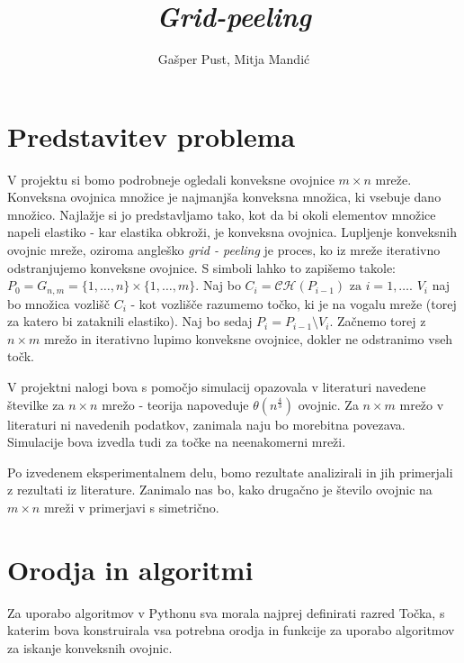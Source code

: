 \documentclass[a4paper]{article}
\title{\textit{Grid-peeling}}
\author{Gašper Pust, Mitja Mandić}
\begin{document}
\lstset{language=Python, breaklines=true, numbers=left, columns=fullflexible, basicstyle=\ttfamily}
\begin{titlepage}
 \maketitle
\end{titlepage}
%

\section{Predstavitev problema}
V projektu si bomo podrobneje ogledali konveksne ovojnice $m \times n$ mreže. Konveksna ovojnica množice je najmanjša konveksna množica, ki vsebuje dano množico.
Najlažje si jo predstavljamo tako, kot da bi okoli elementov množice napeli elastiko - kar elastika obkroži, je konveksna ovojnica. Lupljenje konveksnih ovojnic mreže,
oziroma angleško \textit{grid - peeling} je proces, ko iz mreže iterativno odstranjujemo konveksne ovojnice. S simboli lahko to zapišemo takole:
$ P_{0} = G_{n,m} = \{1,\ldots, n\} \times \{1, \ldots, m\}$. Naj bo $C_{i} = \mathcal{C}\mathcal{H}(P_{i-1}) \text{ za } i = 1, \ldots$. $V_{i}$ naj bo množica vozlišč $C_{i}$
- kot vozlišče razumemo točko, ki je na vogalu mreže (torej za katero bi zataknili elastiko). Naj bo sedaj $P_{i} = P_{i-1} \setminus V_{i}$. Začnemo torej z $n \times m$ mrežo 
in iterativno lupimo konveksne ovojnice, dokler ne odstranimo vseh točk.

V projektni nalogi bova s pomočjo simulacij opazovala v literaturi navedene številke za $n \times n$ mrežo - teorija napoveduje $\theta(n ^ \frac{4}{3})$ ovojnic.
Za $n \times m$ mrežo v literaturi ni navedenih podatkov, zanimala naju bo morebitna povezava. Simulacije bova izvedla tudi za točke na neenakomerni mreži.

Po izvedenem eksperimentalnem delu, bomo rezultate analizirali in jih primerjali z rezultati iz literature. Zanimalo nas bo, kako drugačno je število ovojnic na $m \times n$
mreži v primerjavi s simetrično.

\newpage
\section{Orodja in algoritmi}
Za uporabo algoritmov v Pythonu sva morala najprej definirati razred Točka, s katerim bova konstruirala vsa potrebna orodja in funkcije za uporabo algoritmov za iskanje konveksnih ovojnic.
\end{document}
